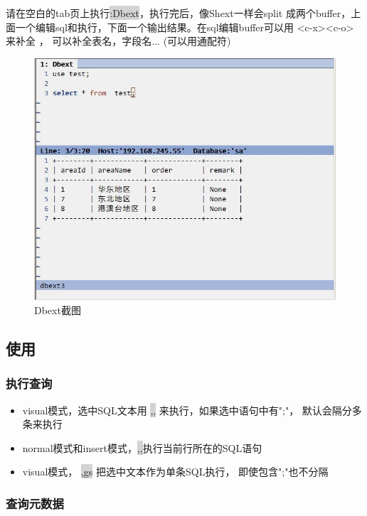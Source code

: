 \documentclass[oneside,openany]{book}
\begin{document}
    请在空白的tab页上执行\colorbox{lightgray}{:Dbext}，执行完后，像Shext一样会split
成两个buffer，上面一个编辑sql和执行，下面一个输出结果。在sql编辑buffer可以用 
<c-x><c-o> 来补全 ， 可以补全表名，字段名... (可以用通配符) 

  \begin{figure}[htbp]%
  \centering
  \includegraphics[scale=0.5]{dbext.jpg}
  \caption{Dbext截图}
  \end{figure}

\subsection{使用}

\subsubsection{执行查询}

    \begin{itemize} 
      \item  visual模式，选中SQL文本用 \colorbox{lightgray}{,,} 来执行，如果选中语句中有";"， 默认会隔分多条来执行
      \item  normal模式和insert模式，\colorbox{lightgray}{,,}执行当前行所在的SQL语句
      \item  visual模式， \colorbox{lightgray}{,gs} 把选中文本作为单条SQL执行， 即使包含";"也不分隔
    \end{itemize} 

\subsubsection{查询元数据}
\end{document}
